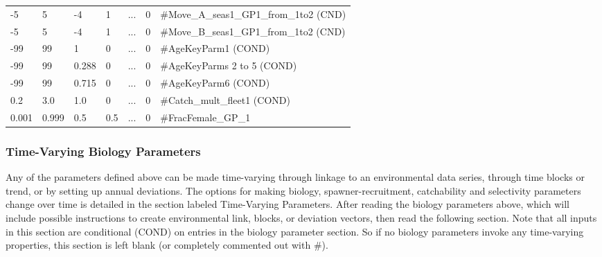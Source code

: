 \begin{center}
\begin{longtable}{p{1.1cm} p{1.1cm} p{1.1cm}  p{1.1cm}  p{1.1cm}  p{1.1cm}  p{8cm}  }
		-5   & 5    & -4   & 1    & ... & 0 & \#Move\_A\_seas1\_GP1\_from\_1to2 (CND)\\
        -5   & 5    & -4   & 1    & ... & 0 & \#Move\_B\_seas1\_GP1\_from\_1to2 (CND)\\
		-99  & 99   &  1   & 0    & ... & 0 & \#AgeKeyParm1 (COND)\\
		-99  & 99   &  0.288   & 0    & ... & 0 & \#AgeKeyParms 2 to 5 (COND)\\
		-99  & 99   &  0.715   & 0    & ... & 0 & \#AgeKeyParm6 (COND)\\	
		0.2  & 3.0   &  1.0   & 0    & ... & 0 & \#Catch\_mult\_fleet1 (COND)\\
		0.001 & 0.999 & 0.5 & 0.5    & ... & 0 & \#FracFemale\_GP\_1 \\		
		\hline
	\end{longtable}
\end{center}

\hypertarget{tvOrder}{}
\subsubsection{Time-Varying Biology Parameters}
Any of the parameters defined above can be made time-varying through linkage to an environmental data series, through time blocks or trend, or by setting up annual deviations.  The options for making biology, spawner-recruitment,  catchability and selectivity parameters change over time is detailed in the section labeled Time-Varying Parameters.  After reading the biology parameters above, which will include possible instructions to create environmental link, blocks, or deviation vectors, then read the following section.  Note that all inputs in this section are conditional (COND) on entries in the biology parameter section.  So if no biology parameters invoke any time-varying properties, this section is left blank (or completely commented out with \#).

